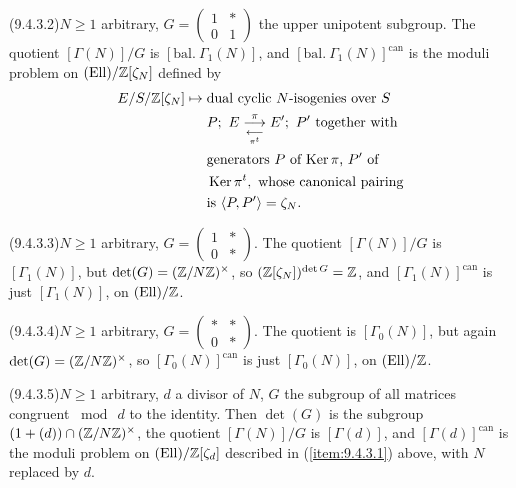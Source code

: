 \par{}\noindent{}\label{item:9.4.3.2}(9.4.3.2)\enspace $N \ge 1$ arbitrary, $G = \begin{pmatrix} 1 & * \\ 0 & 1 \end{pmatrix}$ the upper unipotent subgroup. The quotient $[\Gamma(N)]/G$ is $[\mathrm{bal.}\ \Gamma_1(N)]$, and $[\mathrm{bal.}\ \Gamma_1(N)]^{\mathrm{can}}$ is the moduli problem on $(\mathrm{Ell})/\mathbb{Z}[\zeta_N]$ defined by
\[
\begin{aligned}
E/S/\mathbb{Z}[\zeta_N] \mapsto {} & \text{dual cyclic $N$-isogenies over $S$} \\
& P;\ E \mathrel{ \mathop{\overset{\,\pi\,}{\longrightarrow}} \limits_{\underset{\,\pi^t\,}{\longleftarrow}} } E';\ P' \text{ together with} \\
& \text{generators $P$ of $\operatorname{Ker}\pi$, $P'$ of} \\
& \operatorname{Ker}\pi^t, \text{ whose canonical pairing} \\
& \text{is } \langle P, P' \rangle = \zeta_N .
\end{aligned}
\]

\par{}\noindent{}\label{item:9.4.3.3}(9.4.3.3)\enspace $N \ge 1$ arbitrary, $G = \begin{pmatrix} 1 & * \\ 0 & * \end{pmatrix}$. The quotient $[\Gamma(N)]/G$ is $[\Gamma_1(N)]$, but $\det(G) = (\mathbb{Z}/N\mathbb{Z})^\times$, so $(\mathbb{Z}[\zeta_N])^{\det G} = \mathbb{Z}$, and $[\Gamma_1(N)]^{\mathrm{can}}$ is just $[\Gamma_1(N)]$, on $(\mathrm{Ell})/\mathbb{Z}$.

\par{}\noindent{}\label{item:9.4.3.4}(9.4.3.4)\enspace $N \ge 1$ arbitrary, $G = \begin{pmatrix} * & * \\ 0 & * \end{pmatrix}$. The quotient is $[\Gamma_0(N)]$, but again $\det(G) = (\mathbb{Z}/N\mathbb{Z})^\times$, so $[\Gamma_0(N)]^{\mathrm{can}}$ is just $[\Gamma_0(N)]$, on $(\mathrm{Ell})/\mathbb{Z}$.

\par{}\noindent{}\label{item:9.4.3.5}(9.4.3.5)\enspace $N \ge 1$ arbitrary, $d$ a divisor of $N$, $G$ the subgroup of all matrices congruent $\bmod\ d$ to the identity. Then $\det(G)$ is the subgroup $(1+(d)) \cap (\mathbb{Z}/N\mathbb{Z})^\times$, the quotient $[\Gamma(N)]/G$ is $[\Gamma(d)]$, and $[\Gamma(d)]^{\mathrm{can}}$ is the moduli problem on $(\mathrm{Ell})/\mathbb{Z}[\zeta_d]$ described in (\ref{item:9.4.3.1}) above, with $N$ replaced by $d$.

